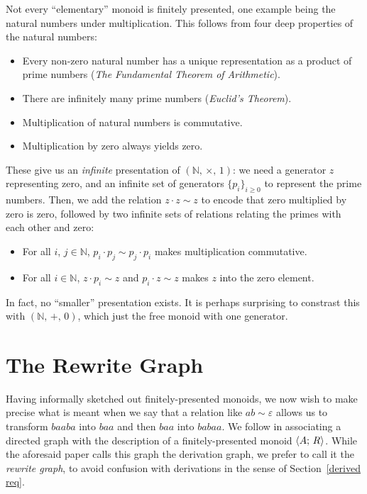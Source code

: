 \documentclass[../generics]{subfiles}
\begin{document}
\begin{example}
Not every ``elementary'' monoid is finitely presented, one example being the natural numbers under multiplication. This follows from four deep properties of the natural numbers:
\begin{itemize}
\item Every non-zero natural number has a unique representation as a product of prime numbers (\emph{The Fundamental Theorem of Arithmetic}).
\item There are infinitely many prime numbers (\emph{Euclid's Theorem}).
\item Multiplication of natural numbers is commutative.
\item Multiplication by zero always yields zero.
\end{itemize}
These give us an \emph{infinite} presentation of $(\mathbb{N},\,\times,\,1)$: we need a generator $z$ representing zero, and an infinite set of generators $\{p_i\}_{i\geq 0}$ to represent the prime numbers. Then, we add the relation $z\cdot z\sim z$ to encode that zero multiplied by zero is zero, followed by two infinite sets of relations relating the primes with each other and zero:
\begin{itemize}
\item For all $i$, $j\in\mathbb{N}$, $p_i\cdot p_j\sim p_j\cdot p_i$ makes multiplication commutative.
\item For all $i\in\mathbb{N}$, $z\cdot p_i\sim z$ and $p_i\cdot z\sim z$ makes $z$ into the zero element.
\end{itemize}
In fact, no ``smaller'' presentation exists. It is perhaps surprising to constrast this with $(\mathbb{N},\,+,\,0)$, which just the free monoid with one generator.
\end{example}

\section{The Rewrite Graph}\label{rewrite graph}
Having informally sketched out finitely-presented monoids, we now wish to make precise what is meant when we say that a relation like $ab\sim\varepsilon$ allows us to transform $baaba$ into $baa$ and then $baa$ into $babaa$. We follow \cite{SQUIER1994271} in associating a directed graph with the description of a finitely-presented monoid $\langle A;\,R\rangle$. While the aforesaid paper calls this graph the derivation graph, we prefer to call it the \emph{rewrite graph}, to avoid confusion with derivations in the sense of Section~\ref{derived req}.
\end{document}
